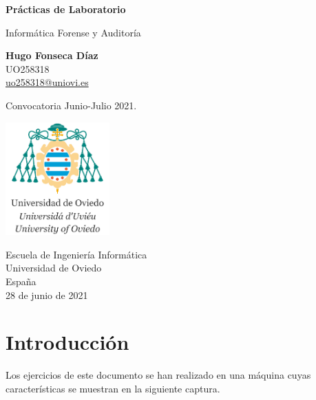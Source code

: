 \documentclass[11pt]{article}
\begin{document}
\begin{titlepage}
 \begin{center}
        \vspace*{1cm}
            
        \Huge
        \textbf{Prácticas de Laboratorio}
            
        \vspace{0.5cm}
        \LARGE
        Informática Forense y Auditoría
            
        \vspace{1.5cm}
            
        \textbf{Hugo Fonseca Díaz}\\
        UO258318\\
        \href{mailto:uo258318@uniovi.es}{uo258318@uniovi.es}
            
        \vfill
            
        Convocatoria Junio-Julio 2021.
            
        \vspace{0.8cm}
            
        \includegraphics[width=0.3\textwidth]{other/uniovi_logo.jpg}
            
        \Large
        Escuela de Ingeniería Informática\\
        Universidad de Oviedo\\
        España\\
        28 de junio de 2021
            
    \end{center}
\end{titlepage}

\newpage

\tableofcontents

\newpage

\section{Introducción}
Los ejercicios de este documento se han realizado en una máquina cuyas características se muestran en la siguiente captura.
\end{document}
